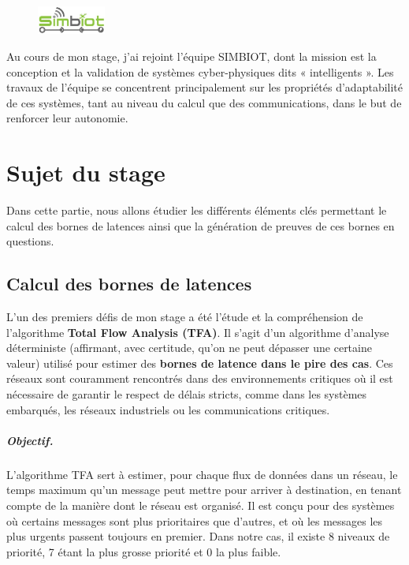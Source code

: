 \documentclass[12pt]{report}
\begin{document}
\vspace{1cm}

\begin{figure}
    \vspace{-3pt}
    \includegraphics[width=0.20\textwidth]{logo_simbiot.png}
    \vspace{-3pt}
\end{figure}

Au cours de mon stage, j'ai rejoint l'équipe SIMBIOT, dont la mission est la conception et la validation de systèmes cyber-physiques dits « intelligents ». 
Les travaux de l'équipe se concentrent principalement sur les propriétés d'adaptabilité de ces systèmes, tant au niveau du calcul que des communications, dans le but de renforcer leur autonomie.



\chapter{Sujet du stage}

Dans cette partie, nous allons étudier les différents éléments clés permettant
le calcul des bornes de latences ainsi que la génération de preuves de ces bornes
en questions.

\section*{Calcul des bornes de latences}

L'un des premiers défis de mon stage a été l'étude et la compréhension de l'algorithme 
\textbf{Total Flow Analysis (TFA)}. Il s'agit d'un algorithme d'analyse déterministe
(affirmant, avec certitude, qu'on ne peut dépasser une certaine valeur) utilisé pour estimer des \textbf{bornes de latence dans le pire des cas}. Ces réseaux sont couramment rencontrés dans des environnements critiques où il est nécessaire de garantir le respect de délais stricts, comme dans les systèmes embarqués, les réseaux industriels ou les communications critiques.

\paragraph{Objectif.} L'algorithme TFA sert à estimer, pour chaque flux de données dans un réseau, le temps maximum qu'un message peut mettre pour arriver à destination, en tenant compte de la manière dont le réseau est organisé. Il est conçu pour des systèmes où certains messages sont plus prioritaires que d'autres, et où les messages les plus urgents passent toujours en premier. Dans notre cas, il existe 8 niveaux de priorité, 7 étant la plus grosse priorité et 0 la plus faible.
\end{document}
